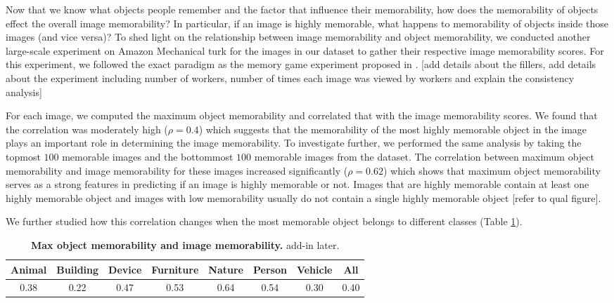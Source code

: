 Now that we know what objects people remember and the factor that influence their memorability, how does the memorability of objects effect the overall image memorability? In particular, if an image is highly memorable, what happens to memorability of objects inside those images (and vice versa)? To shed light on the relationship between image memorability and object memorability, we conducted another large-scale experiment on Amazon Mechanical turk for the images in our dataset to gather their respective image memorability scores. For this experiment, we followed the exact paradigm as the memory game experiment proposed in \cite{isola11}. [add details about the fillers, add details about the experiment including number of workers, number of times each image was viewed by workers and explain the consistency analysis]

For each image, we computed the maximum object memorability and correlated that with the image memorability scores. We found that the correlation was moderately high ($\rho=0.4$) which suggests that the memorability of the most highly memorable object in the image plays an important role in determining the image memorability. To investigate further, we performed the same analysis by taking the topmost $100$ memorable images and the bottommost $100$ memorable images from the dataset. The correlation between maximum object memorability and image memorability for these images increased significantly ($\rho=0.62$) which shows that maximum object memorability serves as a strong features in predicting if an image is highly memorable or not. Images that are highly memorable contain at least one highly memorable object and images with low memorability usually do not contain a single highly memorable object [refer to qual figure].

We further studied how this correlation changes when the most memorable object belongs to different classes (Table \ref{tab:tableMem}).  

\begin{table}[t]
    \begin{tabular}{cccccccc}
    \hline
    Animal & Building & Device & Furniture & Nature & Person & Vehicle & All  \\ \hline
    0.38   & 0.22     & 0.47   & 0.53      & 0.64   & 0.54   & 0.30    & 0.40 \\ \hline
    \end{tabular}
    \caption{\footnotesize\textbf{Max object memorability and image memorability.} add-in later. }\label{tab:tableMem}
\end{table}



